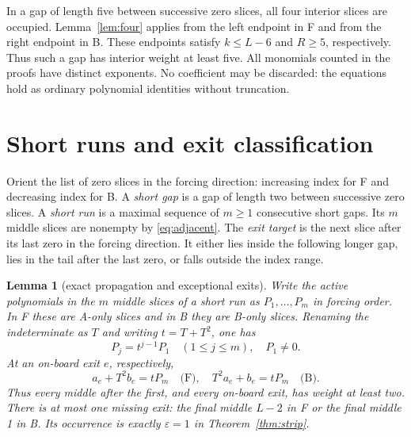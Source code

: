 \documentclass{article}
\newtheorem{lemma}{Lemma}
\begin{document}
In a gap of length five between successive zero slices, all four interior slices are occupied.
Lemma~\ref{lem:four} applies from the left endpoint in F and from the right endpoint in B. These
endpoints satisfy \(k \le L-6\) and \(R \ge 5\), respectively. Thus such a gap has interior weight
at least five. All monomials counted in the proofs have distinct exponents. No coefficient may be discarded: the equations hold as ordinary polynomial identities without truncation.

\section{Short runs and exit classification}\label{sec:runs}

Orient the list of zero slices in the forcing direction: increasing index for F and decreasing
index for B. A \emph{short gap} is a gap of length two between successive zero slices. A
\emph{short run} is a maximal sequence of \(m \ge 1\) consecutive short gaps. Its \(m\) middle
slices are nonempty by \eqref{eq:adjacent}. The \emph{exit target} is the next slice after its
last zero in the forcing direction. It either lies inside the following longer gap, lies in the
tail after the last zero, or falls outside the index range.

\begin{lemma}[exact propagation and exceptional exits]\label{lem:propagation}
  Write the active polynomials in the \(m\) middle slices of a short run as
  \(P_1, \dots, P_m\) in forcing order. In F these are A-only slices and in B they are B-only
  slices. Renaming the indeterminate as \(T\) and writing \(t = T + T^2\), one has
  \begin{equation}\label{eq:run-powers}
    P_j = t^{j-1} P_1 \quad (1 \le j \le m), \quad P_1 \ne 0.
  \end{equation}
  At an on-board exit \(e\), respectively,
  \begin{equation}\label{eq:exit-feed}
    a_e + T^2 b_e = t P_m \quad \text{(F)}, \quad
    T^2 a_e + b_e = t P_m \quad \text{(B)}.
  \end{equation}
  Thus every middle after the first, and every on-board exit, has weight at least two. There is
  at most one missing exit: the final middle \(L-2\) in F or the final middle 1 in B. Its occurrence is
  exactly \(\varepsilon = 1\) in Theorem~\ref{thm:strip}.
\end{lemma}
\end{document}
